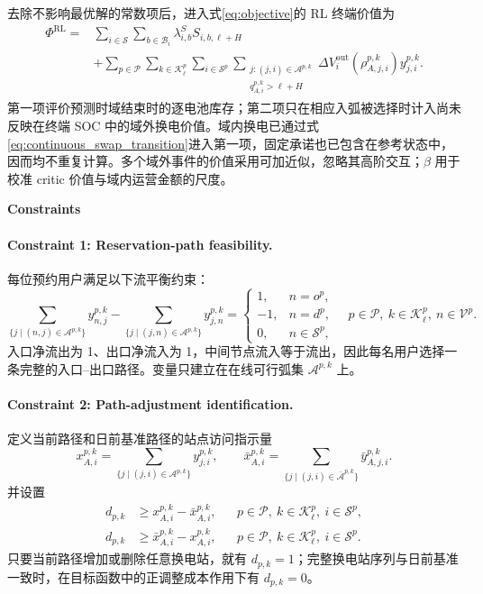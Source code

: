 \documentclass[12pt,a4paper,UTF8]{ctexart}
\begin{document}
去除不影响最优解的常数项后，进入式\eqref{eq:objective}的 RL 终端价值为
\begin{equation}
\begin{aligned}
\Phi^{\mathrm{RL}}
={}&
\sum_{i\in\mathcal S}\sum_{b\in\mathcal B_i}
\lambda^S_{i,b}S_{i,b,\ell+H}\\
&+\sum_{p\in\mathcal P}
\sum_{k\in\mathcal K_\ell^p}
\sum_{i\in\mathcal S^p}
\sum_{\substack{j:(j,i)\in\mathcal A^{p,k}\\
q_{A,i}^{p,k}>\ell+H}}
\Delta V_{i}^{\mathrm{out}}\!\left(\rho_{A,j,i}^{p,k}\right)
y_{j,i}^{p,k}.
\end{aligned}
\label{eq:rl_terminal_value}
\end{equation}
第一项评价预测时域结束时的逐电池库存；第二项只在相应入弧被选择时计入尚未反映在终端 SOC 中的域外换电价值。域内换电已通过式\eqref{eq:continuous_swap_transition}进入第一项，固定承诺也已包含在参考状态中，因而均不重复计算。多个域外事件的价值采用可加近似，忽略其高阶交互；$\beta$ 用于校准 critic 价值与域内运营金额的尺度。

\textbf{Constraints}

\paragraph{Constraint 1: Reservation-path feasibility.}
每位预约用户满足以下流平衡约束：
\begin{equation}
\sum_{\{j\mid(n,j)\in\mathcal A^{p,k}\}}
y_{n,j}^{p,k}
-
\sum_{\{j\mid(j,n)\in\mathcal A^{p,k}\}}
y_{j,n}^{p,k}
=
\begin{cases}
1,&n=o^p,\\
-1,&n=d^p,\\
0,&n\in\mathcal S^p,
\end{cases}
\quad
p\in\mathcal P,\ k\in\mathcal K_\ell^p,\ n\in\mathcal V^p.
\label{eq:flow}
\end{equation}
入口净流出为 1、出口净流入为 1，中间节点流入等于流出，因此每名用户选择一条完整的入口--出口路径。变量只建立在在线可行弧集
$\mathcal A^{p,k}$ 上。

\paragraph{Constraint 2: Path-adjustment identification.}
定义当前路径和日前基准路径的站点访问指示量
\begin{equation}
x_{A,i}^{p,k}
=
\sum_{\{j\mid(j,i)\in\mathcal A^{p,k}\}}y_{j,i}^{p,k},
\qquad
\bar x_{A,i}^{p,k}
=
\sum_{\{j\mid(j,i)\in\bar{\mathcal A}^{p,k}\}}\bar y_{A,j,i}^{p,k}.
\label{eq:station_visit_indicator}
\end{equation}
并设置
\begin{subequations}
\label{eq:path_adjustment_indicator}
\begin{align}
d_{p,k}
&\ge x_{A,i}^{p,k}-\bar x_{A,i}^{p,k},
&&p\in\mathcal P,\ k\in\mathcal K_\ell^p,\ i\in\mathcal S^p,\\
d_{p,k}
&\ge \bar x_{A,i}^{p,k}-x_{A,i}^{p,k},
&&p\in\mathcal P,\ k\in\mathcal K_\ell^p,\ i\in\mathcal S^p.
\end{align}
\end{subequations}
只要当前路径增加或删除任意换电站，就有 $d_{p,k}=1$；完整换电站序列与日前基准一致时，在目标函数中的正调整成本作用下有 $d_{p,k}=0$。
\end{document}
